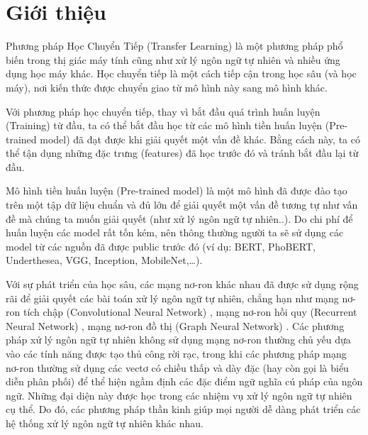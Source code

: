 \section{Giới thiệu}
Phương pháp Học Chuyển Tiếp (Transfer Learning) là một phương pháp phổ biến trong thị giác máy tính cũng như xử lý ngôn ngữ tự nhiên và nhiều ứng dụng học máy khác. Học chuyển tiếp là một cách tiếp cận trong học sâu (và học máy), nơi kiến thức được chuyển giao từ mô hình này sang mô hình khác.

Với phương pháp học chuyển tiếp, thay vì bắt đầu quá trình huấn luyện (Training) từ đầu, ta có thể bắt đầu học từ các mô hình tiền huấn luyện (Pre-trained model) đã đạt được khi giải quyết một vấn đề khác. Bằng cách này, ta có thể tận dụng những đặc trưng (features) đã học trước đó và tránh bắt đầu lại từ đầu.

Mô hình tiền huấn luyện (Pre-trained model) là một mô hình đã được đào tạo trên một tập dữ liệu chuẩn và đủ lớn để giải quyết một vấn đề tương tự như vấn đề mà chúng ta muốn giải quyết (như xử lý ngôn ngữ tự nhiên..). Do chi phí để huấn luyện các model rất tốn kém, nên thông thường người ta sẽ sử dụng các model từ các nguồn đã được public trước đó (ví dụ: BERT, PhoBERT, Underthesea, VGG, Inception, MobileNet,…).

Với sự phát triển của học sâu, các mạng nơ-ron khác nhau đã được sử dụng rộng rãi để giải quyết các bài toán xử lý ngôn ngữ tự nhiên, chẳng hạn như mạng nơ-ron tích chập (Convolutional Neural Network) \citep{gehring2017convolutional, kalchbrenner-etal-2014-convolutional, kim-2014-convolutional}, mạng nơ-ron hồi quy (Recurrent Neural Network) \citep{sutskever-2014-sequence, liu-2016-recurrent}, mạng nơ-ron đồ thị (Graph Neural Network) \citep{socher-2013-recursivedeep, tai2015improved, marcheggiani2018exploiting}. Các phương pháp xử lý ngôn ngữ tự nhiên không sử dụng mạng nơ-ron thường chủ yếu dựa vào các tính năng được tạo thủ công rời rạc, trong khi các phương pháp mạng nơ-ron thường sử dụng các vectơ có chiều thấp và dày đặc (hay còn gọi là biểu diễn phân phối) để thể hiện ngầm định các đặc điểm ngữ nghĩa cú pháp của ngôn ngữ. Những đại diện này được học trong các nhiệm vụ xử lý ngôn ngữ tự nhiên cụ thể. Do đó, các phương pháp thần kinh giúp mọi người dễ dàng phát triển các hệ thống xử lý ngôn ngữ tự nhiên khác nhau.

